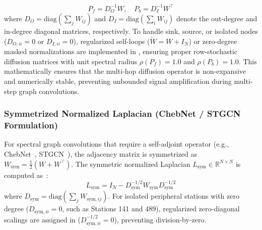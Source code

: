 \documentclass[preprint,12pt]{elsarticle}
\begin{document}
\begin{equation}
    P_f = D_O^{-1} W, \quad P_b = D_I^{-1} W^\top
\end{equation}
where $D_O = \text{diag}(\sum_{j} W_{ij})$ and $D_I = \text{diag}(\sum_{i} W_{ij})$ denote the out-degree and in-degree diagonal matrices, respectively. To handle sink, source, or isolated nodes ($D_{O, ii} = 0$ or $D_{I, ii} = 0$), regularized self-loops ($\tilde{W} = W + I_N$) or zero-degree masked normalizations are implemented in , ensuring proper row-stochastic diffusion matrices with unit spectral radius $\rho(P_f) = 1.0$ and $\rho(P_b) = 1.0$. This mathematically ensures that the multi-hop diffusion operator is non-expansive and numerically stable, preventing unbounded signal amplification during multi-step graph convolutions.

\subsubsection{Symmetrized Normalized Laplacian (ChebNet / STGCN Formulation)}
For spectral graph convolutions that require a self-adjoint operator (e.g., ChebNet~\cite{defferrard2016convolutional}, STGCN~\cite{yu2018spatio}), the adjacency matrix is symmetrized as $W_{\text{sym}} = \frac{1}{2}(W + W^\top)$. The symmetric normalized Laplacian $L_{\text{sym}} \in \mathbb{R}^{N \times N}$ is computed as~\cite{kipf2017semi}:
\begin{equation}
    L_{\text{sym}} = I_N - D_{\text{sym}}^{-1/2} W_{\text{sym}} D_{\text{sym}}^{-1/2}
\end{equation}
where $D_{\text{sym}} = \text{diag}(\sum_{j} W_{\text{sym}, ij})$. For isolated peripheral stations with zero degree ($D_{\text{sym}, ii} = 0$, such as Stations 141 and 489), regularized zero-diagonal scalings are assigned in  ($D_{\text{sym}, ii}^{-1/2} = 0$), preventing division-by-zero. 
\end{document}
